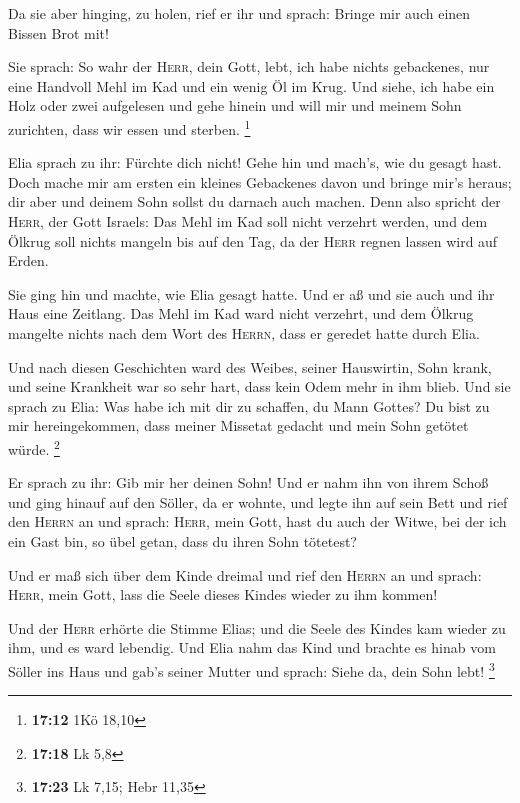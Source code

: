  Da sie aber hinging, zu holen, rief er ihr und sprach:
Bringe mir auch einen Bissen Brot mit!

 Sie sprach: So wahr der \textsc{Herr}, dein Gott, lebt,
ich habe nichts gebackenes, nur eine Handvoll Mehl im Kad und ein wenig
Öl im Krug. Und siehe, ich habe ein Holz oder zwei aufgelesen und gehe
hinein und will mir und meinem Sohn zurichten, dass wir essen und
sterben. \footnote{\textbf{17:12} 1Kö 18,10}

 Elia sprach zu ihr: Fürchte dich nicht! Gehe hin und
mach's, wie du gesagt hast. Doch mache mir am ersten ein kleines
Gebackenes davon und bringe mir's heraus; dir aber und deinem Sohn
sollst du darnach auch machen.  Denn also spricht der
\textsc{Herr}, der Gott Israels: Das Mehl im Kad soll nicht verzehrt
werden, und dem Ölkrug soll nichts mangeln bis auf den Tag, da der
\textsc{Herr} regnen lassen wird auf Erden.

 Sie ging hin und machte, wie Elia gesagt hatte. Und er
aß und sie auch und ihr Haus eine Zeitlang.  Das Mehl im
Kad ward nicht verzehrt, und dem Ölkrug mangelte nichts nach dem Wort
des \textsc{Herrn}, dass er geredet hatte durch Elia.

 Und nach diesen Geschichten ward des Weibes, seiner
Hauswirtin, Sohn krank, und seine Krankheit war so sehr hart, dass kein
Odem mehr in ihm blieb.  Und sie sprach zu Elia: Was habe
ich mit dir zu schaffen, du Mann Gottes? Du bist zu mir hereingekommen,
dass meiner Missetat gedacht und mein Sohn getötet würde. \footnote{\textbf{17:18}
  Lk 5,8}

 Er sprach zu ihr: Gib mir her deinen Sohn! Und er nahm
ihn von ihrem Schoß und ging hinauf auf den Söller, da er wohnte, und
legte ihn auf sein Bett  und rief den \textsc{Herrn} an
und sprach: \textsc{Herr}, mein Gott, hast du auch der Witwe, bei der
ich ein Gast bin, so übel getan, dass du ihren Sohn tötetest?

 Und er maß sich über dem Kinde dreimal und rief den
\textsc{Herrn} an und sprach: \textsc{Herr}, mein Gott, lass die Seele
dieses Kindes wieder zu ihm kommen!

 Und der \textsc{Herr} erhörte die Stimme Elias; und die
Seele des Kindes kam wieder zu ihm, und es ward lebendig.
 Und Elia nahm das Kind und brachte es hinab vom Söller
ins Haus und gab's seiner Mutter und sprach: Siehe da, dein Sohn lebt!
\footnote{\textbf{17:23} Lk 7,15; Hebr 11,35}

